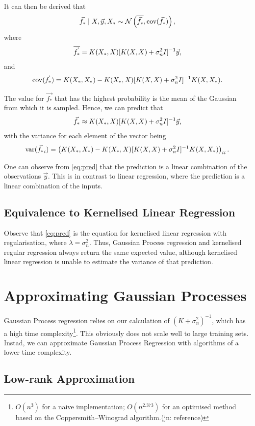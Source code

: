 \documentclass[11pt,twoside,openright]{report}
\newcommand\cN{\mathcal{N}}
\DeclareMathOperator{\var}{var}
\DeclareMathOperator{\cov}{cov}
\newcommand\jn[1]{{\color{red}(jn: #1)}}
\begin{document}
It can then be derived that \[
    \vec{f_*} \mid X, \vec{y}, X_* \sim \cN\left(\overline{\vec{f_*}}, \cov(\vec{f_*})\right)\text,
\] where \[
    \overline{\vec{f_*}} = K(X_*, X)[K(X, X) + \sigma_n^2I]^{-1}\vec{y}\text,
\] and \[
    \cov(\vec{f_*}) = K(X_*, X_*) - K(X_*, X)[K(X, X) + \sigma_n^2I]^{-1}K(X, X_*)\text.
\]

The value for $\vec{f_*}$ that has the highest probability is the mean of the Gaussian from which it is sampled. Hence, we can predict that \begin{equation}
    \label{eq:pred}
    \vec{f_*} \approx K(X_*, X)[K(X, X) + \sigma_n^2I]^{-1}\vec{y}\text,
\end{equation} with the variance for each element of the vector being\[
    \var(\vec{f_*}_i) = \left( K(X_*, X_*) - K(X_*, X)[K(X, X) + \sigma_n^2I]^{-1}K(X, X_*) \right)_{ii}\text.
\]

One can observe from \cref{eq:pred} that the prediction is a linear combination of the observations $\vec{y}$. This is in contrast to linear regression, where the prediction is a linear combination of the inputs.

\subsection{Equivalence to Kernelised Linear Regression}

Observe that \cref{eq:pred} is the equation for kernelised linear regression with regularisation, where $\lambda=\sigma_n^2$. Thus, Gaussian Process regression and kernelised regular regression always return the same expected value, although kernelised linear regression is unable to estimate the variance of that prediction.

\section{Approximating Gaussian Processes}

Gaussian Process regression relies on our calculation of $(K+\sigma_n^2)^{-1}$, which has a high time complexity\footnote{$O(n^3)$ for a naive implementation; $O(n^{2.373})$ for an optimised method based on the Coppersmith–Winograd algorithm.\jn{reference}}. This obviously does not scale well to large training sets. Instad, we can approximate Gaussian Process Regression with algorithms of a lower time complexity.

\subsection{Low-rank Approximation}
\end{document}
